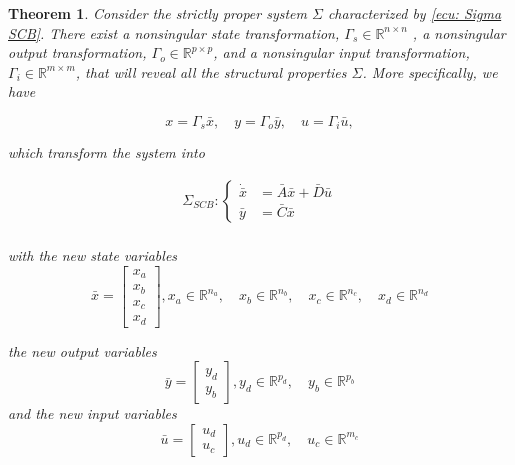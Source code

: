 \documentclass[11pt,letterpaper,twoside,openright]{report}
\newcommand{\RE}{\mathbb{R}}
\newtheorem{theorem}{Theorem}[chapter]
\begin{document}
\begin{theorem}\label{theorem: SCB}
	Consider the strictly proper system $\Sigma$ characterized by \eqref{ecu: Sigma SCB}. There exist a nonsingular state transformation, $\Gamma_s \in \RE^{n\times n}$ , a nonsingular output transformation, $\Gamma_o \in \RE^{p\times p}$, and a nonsingular input transformation, $\Gamma_i \in \RE^{m\times m}$, that will reveal all the structural properties $\Sigma$. More specifically, we have
	
	\begin{equation}
		x=\Gamma_s\bar{x}, \quad y=\Gamma_o\bar{y}, \quad u=\Gamma_i\bar{u},
	\end{equation}

which transform the system into 

\begin{equation}
	\begin{split}\label{ecu: Sigma SCB}
		\Sigma_{SCB}: \left\{
		\begin{array}{rl}
			\dot{\bar{x}} & =\bar{A}\bar{x}+\bar{D}\bar{u} \\
			\bar{y} & = \bar{C}\bar{x}
		\end{array}
		\right. \\
	\end{split}
\end{equation}

with the new state variables 
\begin{equation}
	\bar{x}=
	\begin{bmatrix}
		x_a \\
		x_b \\
		x_c \\
		x_d
	\end{bmatrix}, x_a \in \mathbb{R}^{n_a}, \quad x_b \in \mathbb{R}^{n_b}, \quad x_c \in \mathbb{R}^{n_c}, \quad x_d \in \mathbb{R}^{n_d}
\end{equation}

the new output variables 
\begin{equation}
	\bar{y}=
	\begin{bmatrix}
		y_d \\
		y_b
	\end{bmatrix}, y_d \in \mathbb{R}^{p_d}, \quad y_b \in \mathbb{R}^{p_b}
\end{equation}
and the new input variables
\begin{equation}
	\bar{u}=
	\begin{bmatrix}
		u_d \\
		u_c
	\end{bmatrix}, u_d \in \mathbb{R}^{p_d}, \quad u_c \in \mathbb{R}^{m_c}
\end{equation}


\end{theorem}
\end{document}
